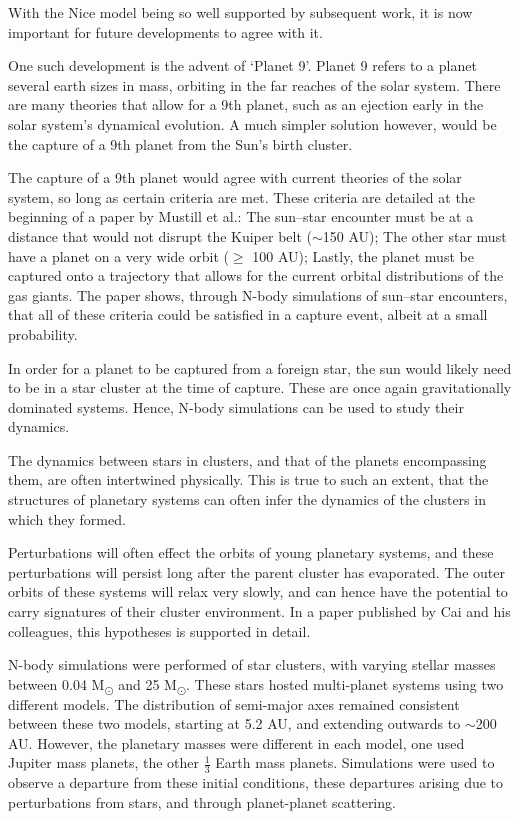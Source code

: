 \documentclass[a4paper,10pt]{article}
\begin{document}
With the Nice model being so well supported by subsequent work, it is now important for future developments to agree with it. 

One such development is the advent of `Planet 9'. Planet 9 refers to a planet several earth sizes in mass, orbiting in the far reaches of the solar system. There are many theories that allow for a 9th planet, such as an ejection early in the solar system's dynamical evolution. A much simpler solution however, would be the capture of a 9th planet from the Sun's birth cluster.  

The capture of a 9th planet would agree with current theories of the solar system, so long as certain criteria are met. These criteria are detailed at the beginning of a paper by Mustill et al.\cite{Planet 9}: The sun--star encounter must be at a distance that would not disrupt the Kuiper belt ($\sim$150 AU); The other star must have a planet on a very wide orbit ($\geq$ 100 AU); Lastly, the planet must be captured onto a trajectory that allows for the current orbital distributions of the gas giants. The paper shows, through N-body simulations of sun--star encounters, that all of these criteria could be satisfied in a capture event, albeit at a small probability. 

In order for a planet to be captured from a foreign star, the sun would likely need to be in a star cluster at the time of capture. These are once again gravitationally dominated systems. Hence, N-body simulations can be used to study their dynamics.

The dynamics between stars in clusters, and that of the planets encompassing them, are often intertwined physically. This is true to such an extent, that the structures of planetary systems can often infer the dynamics of the clusters in which they formed. 

Perturbations will often effect the orbits of young planetary systems, and these perturbations will persist long after the parent cluster has evaporated. The outer orbits of these systems will relax very slowly, and can hence have the potential to carry signatures of their cluster environment. In a paper published by Cai and his colleagues, this hypotheses is supported in detail\cite{Signatures}.

N-body simulations were performed of star clusters, with varying stellar masses between 0.04 M\textsubscript{\(\odot\)} and 25 M\textsubscript{\(\odot\)}. These stars hosted multi-planet systems using two different models. The distribution of semi-major axes remained consistent between these two models, starting at 5.2 AU, and extending outwards to $\sim$200 AU. However, the planetary masses were different in each model, one used Jupiter mass planets, the other $\frac{1}{3}$ Earth mass planets. Simulations were used to observe a departure from these initial conditions, these departures arising due to perturbations from stars, and through planet-planet scattering.
\end{document}
